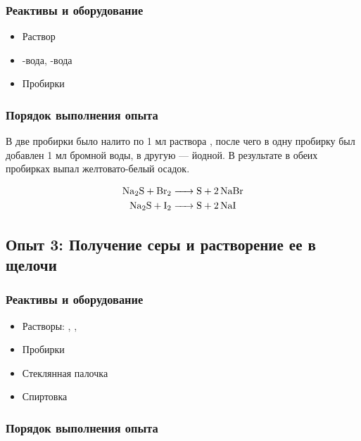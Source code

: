\documentclass[a4paper, 12pt]{article}
\begin{document}
\subsubsection{Реактивы и оборудование}

\begin{itemize}
	\item Раствор 
	
	\item {}-вода, -вода
	
	\item Пробирки
\end{itemize}

\subsubsection{Порядок выполнения опыта}

В две пробирки было налито по 1 мл раствора , после чего в одну пробирку был добавлен 1 мл бромной воды, в другую --- йодной. В результате в обеих пробирках выпал желтовато-белый осадок.

\begin{align}
	\ce{Na2S + Br2 &-> S + 2NaBr}\\
	\ce{Na2S + I2 &-> S + 2NaI}
\end{align}

\subsection{Опыт 3: Получение серы и растворение ее в щелочи}

\subsubsection{Реактивы и оборудование}

\begin{itemize}
	\item Растворы: , , 
	
	\item Пробирки
	
	\item Стеклянная палочка
	
	\item Спиртовка
\end{itemize}

\subsubsection{Порядок выполнения опыта}
\end{document}
